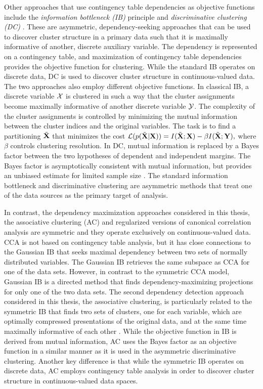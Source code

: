 Other approaches that use contingency table dependencies as objective
functions include the {\it information bottleneck (IB)} principle
\citep{Tishby99} and {\it discriminative clustering (DC)}
\citep{Sinkkonen02ecml, Kaski05nc}. These are asymmetric,
dependency-seeking approaches that can be used to discover cluster
structure in a primary data such that it is maximally informative of
another, discrete auxiliary variable. The dependency is represented on
a contingency table, and maximization of contingency table
dependencies provides the objective function for clustering. While the
standard IB operates on discrete data, DC is used to discover cluster
structure in continuous-valued data. The two approaches also employ
different objective functions. In classical IB, a discrete variable
$\mathcal{X}$ is clustered in such a way that the cluster assignments become
maximally informative of another discrete variable $\mathcal{Y}$. The
complexity of the cluster assignments is controlled by minimizing the
mutual information between the cluster indices and the original
variables. The task is to find a partitioning $\tilde{\mathbf{X}}$ that
minimizes the cost \({\cal L}(p(\tilde{\mathbf{X}}|\mathbf{X})) = I(\tilde{\mathbf{X}}; \mathbf{X}) - \beta
I(\tilde{\mathbf{X}}; \mathbf{Y}),\) where $\beta$ controls clustering resolution. In
DC, mutual information is replaced by a Bayes factor between the two
hypotheses of dependent and independent margins. The Bayes factor is
asymptotically consistent with mutual information, but provides an
unbiased estimate for limited sample size \citep[see
e.g.][]{Sinkkonen05tr}. The standard information bottleneck and
discriminative clustering are asymmetric methods that treat one of the
data sources as the primary target of analysis.

In contrast, the dependency maximization approaches considered in this
thesis, the associative clustering (AC) and regularized versions of
canonical correlation analysis are symmetric and they operate
exclusively on continuous-valued data.  CCA is not based on
contingency table analysis, but it has close connections to the
Gaussian IB \citep{Chechik05} that seeks maximal dependency between
two sets of normally distributed variables. The Gaussian IB retrieves
the same subspace as CCA for one of the data sets. However, in
contrast to the symmetric CCA model, Gaussian IB is a directed method
that finds dependency-maximizing projections for only one of the two
data sets.  The second dependency detection approach considered in
this thesis, the associative clustering, is particularly related to
the symmetric IB that finds two sets of clusters, one for each
variable, which are optimally compressed presentations of the original
data, and at the same time maximally informative of each other
\citep{Friedman01}. While the objective function in IB is derived from
mutual information, AC uses the Bayes factor as an objective function
in a similar manner as it is used in the asymmetric discriminative
clustering. Another key difference is that while the symmetric IB
operates on discrete data, AC employs contingency table analysis in
order to discover cluster structure in continuous-valued data spaces.






